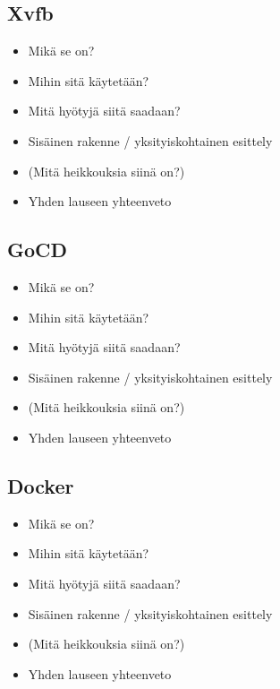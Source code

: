   \subsection{Xvfb} \label{ch:08_xvfb}


    \begin{itemize}
      \item Mikä se on?
      \item Mihin sitä käytetään?
      \item Mitä hyötyjä siitä saadaan?
      \item Sisäinen rakenne / yksityiskohtainen esittely
      \item (Mitä heikkouksia siinä on?)
      \item Yhden lauseen yhteenveto
    \end{itemize}

  \subsection{GoCD} \label{ch:08_gocd}


    \begin{itemize}
      \item Mikä se on?
      \item Mihin sitä käytetään?
      \item Mitä hyötyjä siitä saadaan?
      \item Sisäinen rakenne / yksityiskohtainen esittely
      \item (Mitä heikkouksia siinä on?)
      \item Yhden lauseen yhteenveto
    \end{itemize}

  \subsection{Docker} \label{ch:08_docker}


    \begin{itemize}
      \item Mikä se on?
      \item Mihin sitä käytetään?
      \item Mitä hyötyjä siitä saadaan?
      \item Sisäinen rakenne / yksityiskohtainen esittely
      \item (Mitä heikkouksia siinä on?)
      \item Yhden lauseen yhteenveto
    \end{itemize}

